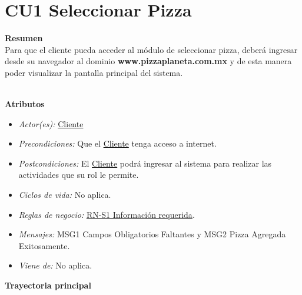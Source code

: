 
\pagebreak
\hypertarget{CU1}{}
\section{CU1 Seleccionar Pizza}

	\noindent \textbf{Resumen}\\

		Para que el cliente pueda acceder al módulo de seleccionar pizza, deberá ingresar desde su navegador al dominio {\textbf{www.pizzaplaneta.com.mx}} y de esta manera poder visualizar la pantalla principal del sistema.

	\noindent \textbf{\\Atributos}

		\begin{itemize}

			\item \textit{Actor(es):} \hyperlink{A:Cliente}{Cliente}
			\item \textit{Precondiciones:} Que el \hyperlink{A:Cliente}{Cliente} tenga acceso a internet. 
			\item \textit{Postcondiciones:} El \hyperlink{A:Cliente}{Cliente} podrá ingresar al sistema para realizar las actividades que su rol le permite.
			\item \textit{Ciclos de vida:} No aplica.
			\item \textit{Reglas de negocio:} \hyperlink{RN:S1:InfoRequerida}{RN-S1 Información requerida}.
			\item \textit{Mensajes:} MSG1 Campos Obligatorios Faltantes y MSG2 Pizza Agregada Exitosamente.
			\item \textit{Viene de:} No aplica.

		\end{itemize} 

	\noindent \textbf{Trayectoria principal}

